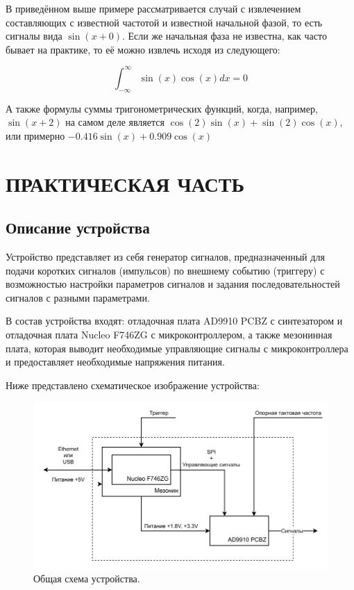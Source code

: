 \documentclass[rusmathsym, eqnumwithinsec, amspack, hyperref]{bomgost}
\begin{document}
В приведённом выше примере рассматривается случай с извлечением составляющих с известной частотой и известной начальной фазой, то есть сигналы вида $\sin(x+0)$. Если же начальная фаза не известна, как часто бывает на практике, то её можно извлечь исходя из следующего:

\begin{equation}
	\int_{-\infty}^{\infty}{\sin(x)\cos(x)}{dx}=0
\end{equation}

А также формулы суммы тригонометрических функций, когда, например, $\sin(x+2)$ на самом деле является $\cos(2)\sin(x) + \sin(2)\cos(x)$, или примерно $-0.416\sin(x) + 0.909\cos(x)$

%
%
\section{ПРАКТИЧЕСКАЯ ЧАСТЬ}
\subsection{Описание устройства}

Устройство представляет из себя генератор сигналов, предназначенный для подачи коротких сигналов (импульсов) по внешнему событию (триггеру) с возможностью настройки параметров сигналов и задания последовательностей сигналов с разными параметрами.

В состав устройства входят: отладочная плата AD9910 PCBZ с синтезатором и отладочная плата Nucleo F746ZG с микроконтроллером, а также мезонинная плата, которая выводит необходимые управляющие сигналы с микроконтроллера и предоставляет необходимые напряжения питания.

Ниже представлено схематическое изображение устройства:

%
%
\begin{gostfigure}
\begin{figure}[H]
\centering
\includegraphics{data/system_architecture.drawio.pdf}
\caption{Общая схема устройства.}
\label{fig:system_architecture}
\end{figure}
\end{gostfigure}
\end{document}
